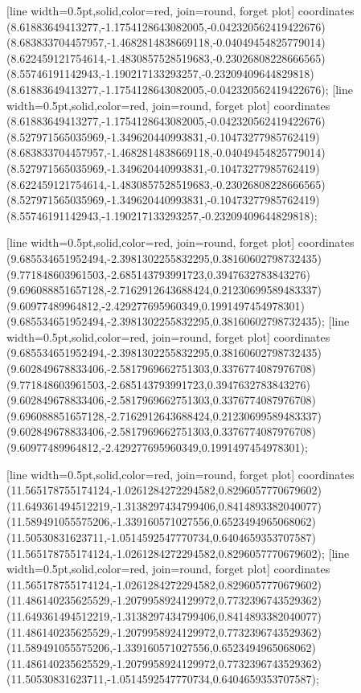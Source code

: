 [line width=0.5pt,solid,color=red, join=round, forget plot] coordinates {(8.61883649413277,-1.1754128643082005,-0.042320562419422676) (8.683833704457957,-1.4682814838669118,-0.04049454825779014) (8.622459121754614,-1.4830857528519683,-0.23026808228666565) (8.55746191142943,-1.190217133293257,-0.23209409644829818) (8.61883649413277,-1.1754128643082005,-0.042320562419422676)};
[line width=0.5pt,solid,color=red, join=round, forget plot] coordinates {(8.61883649413277,-1.1754128643082005,-0.042320562419422676) (8.527971565035969,-1.349620440993831,-0.10473277985762419) (8.683833704457957,-1.4682814838669118,-0.04049454825779014) (8.527971565035969,-1.349620440993831,-0.10473277985762419) (8.622459121754614,-1.4830857528519683,-0.23026808228666565) (8.527971565035969,-1.349620440993831,-0.10473277985762419) (8.55746191142943,-1.190217133293257,-0.23209409644829818)};

[line width=0.5pt,solid,color=red, join=round, forget plot] coordinates {(9.685534651952494,-2.3981302255832295,0.38160602798732435) (9.771848603961503,-2.685143793991723,0.3947632783843276) (9.696088851657128,-2.7162912643688424,0.21230699589483337) (9.60977489964812,-2.429277695960349,0.1991497454978301) (9.685534651952494,-2.3981302255832295,0.38160602798732435)};
[line width=0.5pt,solid,color=red, join=round, forget plot] coordinates {(9.685534651952494,-2.3981302255832295,0.38160602798732435) (9.602849678833406,-2.5817969662751303,0.3376774087976708) (9.771848603961503,-2.685143793991723,0.3947632783843276) (9.602849678833406,-2.5817969662751303,0.3376774087976708) (9.696088851657128,-2.7162912643688424,0.21230699589483337) (9.602849678833406,-2.5817969662751303,0.3376774087976708) (9.60977489964812,-2.429277695960349,0.1991497454978301)};

[line width=0.5pt,solid,color=red, join=round, forget plot] coordinates {(11.565178755174124,-1.0261284272294582,0.8296057770679602) (11.649361494512219,-1.3138297434799406,0.8414893382040077) (11.589491055575206,-1.339160571027556,0.6523494965068062) (11.50530831623711,-1.0514592547770734,0.6404659353707587) (11.565178755174124,-1.0261284272294582,0.8296057770679602)};
[line width=0.5pt,solid,color=red, join=round, forget plot] coordinates {(11.565178755174124,-1.0261284272294582,0.8296057770679602) (11.486140235625529,-1.2079958924129972,0.7732396743529362) (11.649361494512219,-1.3138297434799406,0.8414893382040077) (11.486140235625529,-1.2079958924129972,0.7732396743529362) (11.589491055575206,-1.339160571027556,0.6523494965068062) (11.486140235625529,-1.2079958924129972,0.7732396743529362) (11.50530831623711,-1.0514592547770734,0.6404659353707587)};


